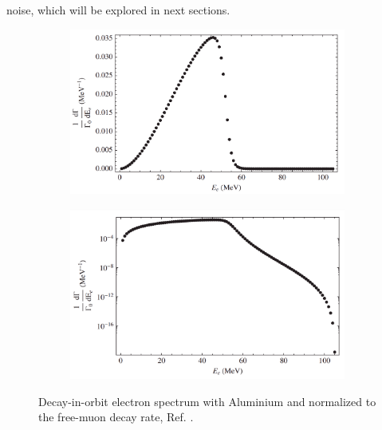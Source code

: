noise, which will be explored in next sections.
\begin{figure}[!h]
     \begin{subfigure}[b]{0.4\linewidth}
         \centering
         \includegraphics[scale = 0.18]{figures/png/Screenshot_20240222_175415.png}
         \label{fig:linearscalemichel}
     \end{subfigure}
     \begin{subfigure}[b]{0.7\linewidth}
         \centering
         \includegraphics[scale = 0.18]{figures/png/Screenshot_20240222_175446.png}
         \label{fig:logscalemichel}
     \end{subfigure}
     \caption[Decay-in-orbit spectrum.]{Decay-in-orbit electron spectrum with Aluminium 
     and normalized to the free-muon decay rate, Ref. \cite{PhysRevD.84.013006}.}
        \label{fig:michel}
\end{figure}

